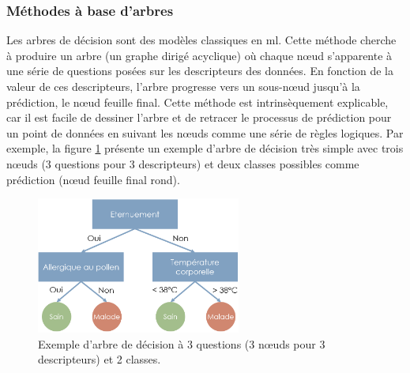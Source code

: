 \subsubsection{Méthodes à base d'arbres}
Les arbres de décision sont des modèles classiques en \gls{ml}. Cette méthode cherche à produire un arbre (un graphe dirigé acyclique) où chaque nœud s'apparente à une série de questions posées sur les descripteurs des données. En fonction de la valeur de ces descripteurs, l'arbre progresse vers un sous-nœud jusqu'à la prédiction, le nœud feuille final. Cette méthode est intrinsèquement explicable, car il est facile de dessiner l'arbre et de retracer le processus de prédiction pour un point de données en suivant les nœuds comme une série de règles logiques. Par exemple, la figure \ref{fig:decision-tree} présente un exemple d'arbre de décision très simple avec trois nœuds (3 questions pour 3 descripteurs) et deux classes possibles comme prédiction (nœud feuille final rond).
\begin{figure}[!ht]
 \centering
 \includegraphics[width=0.6\textwidth]{figures/decision_tree.png}
 \caption[Exemple d'arbre de décision]{Exemple d'arbre de décision à 3 questions (3 nœuds pour 3 descripteurs) et 2 classes.}
 \label{fig:decision-tree}
\end{figure}

